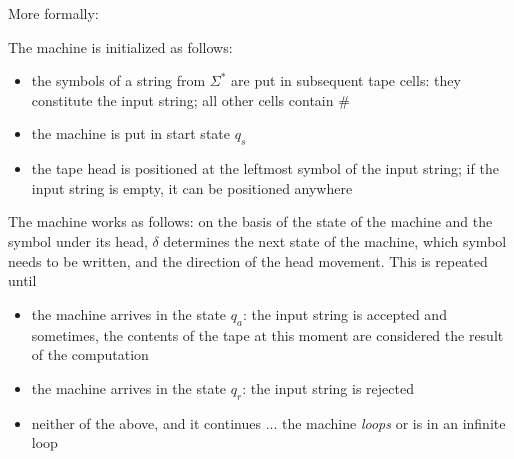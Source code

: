 \vspace{0.5cm} More formally:


The machine is initialized as follows: 
\begin{itemize}
\item the symbols of a string from $\Sigma^*$ are put in subsequent
tape cells: they constitute the input string; all other cells contain
\#
\item the machine is put in start state $q_s$
\item the tape head is positioned at the leftmost symbol of the input
  string; if the input string is empty, it can be positioned anywhere
\end{itemize}

The machine works as follows: on the basis of the state of the
machine and the symbol under its head, $\delta$ determines the next
state of the machine, which symbol needs to be written, and the
direction of the head movement. This is repeated until
\begin{itemize}
\item the machine arrives in the state $q_a$: the input string is
  accepted and sometimes, the contents of the tape at this moment are
  considered the result of the computation
\item the machine arrives in the state $q_r$: the input string is
 rejected
\item neither of the above, and it continues ... the machine {\em
  loops} or is in an infinite loop
\end{itemize}

